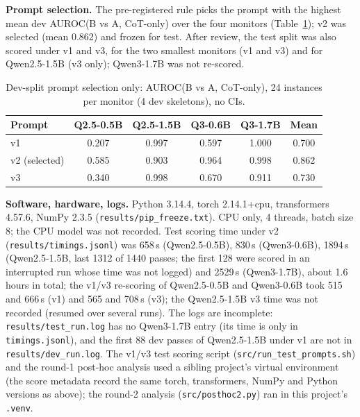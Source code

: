 \documentclass[conference]{IEEEtran}
\begin{document}
\textbf{Prompt selection.} The pre-registered rule picks the prompt with the highest mean dev AUROC(B vs A,
CoT-only) over the four monitors (Table~\ref{tab:dev}); v2 was selected (mean 0.862) and frozen for test. After
review, the test split was also scored under v1 and v3, for the two smallest monitors (v1 and v3) and for Qwen2.5-1.5B (v3 only); Qwen3-1.7B was not re-scored.

\begin{table}[t]
\caption{Dev-split prompt selection only: AUROC(B vs A, CoT-only), 24 instances per monitor (4 dev
skeletons), no CIs.}
\label{tab:dev}
\centering
\footnotesize
\begin{tabular}{@{}lccccc@{}}
\toprule
Prompt & Q2.5-0.5B & Q2.5-1.5B & Q3-0.6B & Q3-1.7B & Mean\\
\midrule
v1 & 0.207 & 0.997 & 0.597 & 1.000 & 0.700\\
v2 (selected) & 0.585 & 0.903 & 0.964 & 0.998 & 0.862\\
v3 & 0.340 & 0.998 & 0.670 & 0.911 & 0.730\\
\bottomrule
\end{tabular}
\end{table}

\textbf{Software, hardware, logs.} Python 3.14.4, torch 2.14.1+cpu, transformers 4.57.6, NumPy 2.3.5
(\texttt{results/pip\_freeze.txt}). CPU only, 4 threads, batch size 8; the CPU model was not recorded. Test
scoring time under v2 (\texttt{results/timings.jsonl}) was 658\,s (Qwen2.5-0.5B), 830\,s (Qwen3-0.6B),
1894\,s (Qwen2.5-1.5B, last 1312 of 1440 passes; the first 128 were scored in an interrupted run whose time was
not logged) and 2529\,s (Qwen3-1.7B), about 1.6 hours in total; the v1/v3 re-scoring of Qwen2.5-0.5B and Qwen3-0.6B took 515
 and 666\,s (v1) and 565 and 708\,s (v3); the Qwen2.5-1.5B v3 time was not recorded (resumed over several runs). The logs are incomplete: \texttt{results/test\_run.log} has no Qwen3-1.7B entry (its time is only in
\texttt{timings.jsonl}), and the first 88 dev passes of Qwen2.5-1.5B under v1 are not in
\texttt{results/dev\_run.log}. The v1/v3 test scoring script (\texttt{src/run\_test\_prompts.sh}) and the round-1 post-hoc analysis
used a sibling project's virtual environment (the score metadata record the same torch, transformers, NumPy and
Python versions as above); the round-2 analysis (\texttt{src/posthoc2.py}) ran in this project's \texttt{.venv}.
\end{document}
